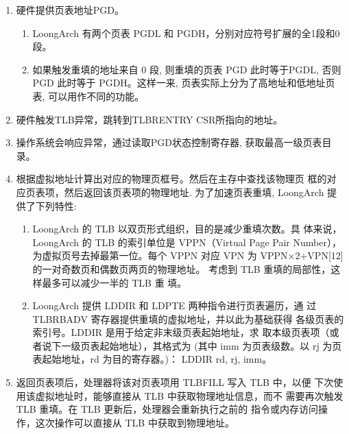 \begin{enumerate}
    \item 硬件提供页表地址PGD。
    \begin{enumerate}[label=$(\mathbf{\arabic*})$]
        \item  LoongArch 有两个页表 PGDL 和 PGDH，分别对应符号扩展的全1段和0段。
        \item  如果触发重填的地址来自 0 段, 则重填的页表 PGD 此时等于PGDL, 否则 PGD 此时等于 PGDH。这样一来, 页表实际上分为了高地址和低地址页表, 可以用作不同的功能。
    \end{enumerate}
    \item 硬件触发TLB异常，跳转到TLBRENTRY CSR所指向的地址。
    \item 操作系统会响应异常，通过读取PGD状态控制寄存器, 获取最高一级页表目录。
    \item 根据虚拟地址计算出对应的物理页框号。然后在主存中查找该物理页
    框的对应页表项，然后返回该页表项的物理地址. 为了加速页表重填,
    LoongArch 提供了下列特性:
    \begin{enumerate}[label=$(\mathbf{\arabic*})$]
        \item LoongArch 的 TLB 以双页形式组织，目的是减少重填次数。具
        体来说，LoongArch 的 TLB 的索引单位是 VPPN（Virtual Page
        Pair Number），为虚拟页号去掉最第一位。每个 VPPN 对应 VPN
        为 VPPN×2+VPN[12] 的一对奇数页和偶数页两页的物理地址。
        考虑到 TLB 重填的局部性，这样最多可以减少一半的 TLB 重
        填。
        \item LoongArch 提供 LDDIR 和 LDPTE 两种指令进行页表遍历，通
        过 TLBRBADV 寄存器提供重填的虚拟地址，并以此为基础获得
        各级页表的索引号。LDDIR 是用于给定非末级页表起始地址，求
        取本级页表项（或者说下一级页表起始地址），其格式为 (其中
        imm 为页表级数。以 rj 为页表起始地址，rd 为目的寄存器。)：
        LDDIR rd, rj, imm。
    \end{enumerate}
    \item 返回页表项后，处理器将该对页表项用 TLBFILL 写入 TLB 中，以便
    下次使用该虚拟地址时，能够直接从 TLB 中获取物理地址信息，而不
    需要再次触发 TLB 重填。在 TLB 更新后，处理器会重新执行之前的
    指令或内存访问操作，这次操作可以直接从 TLB 中获取到物理地址。
\end{enumerate}

